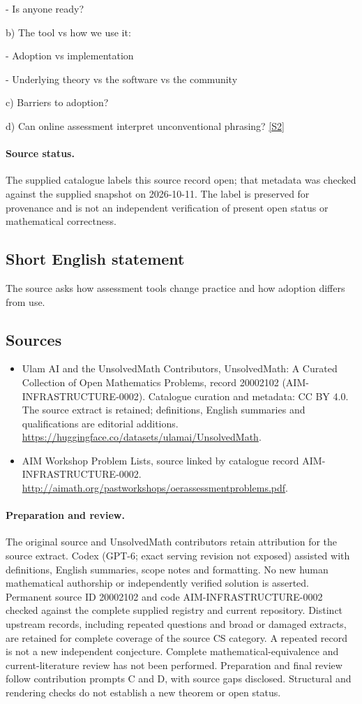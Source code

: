 \documentclass[11pt]{article}
\newcommand{\sref}[2]{\hyperlink{source:#1:#2}{[S#2]}}
\begin{document}
- Is anyone ready?

b) The tool vs how we use it:

- Adoption vs implementation

- Underlying theory vs the software vs the community

c) Barriers to adoption?

d) Can online assessment interpret unconventional phrasing? \sref{20002102}{2}
\paragraph{Source status.}
The supplied catalogue labels this source record open; that metadata was checked against the supplied snapshot on 2026-10-11. The label is preserved for provenance and is not an independent verification of present open status or mathematical correctness.
\subsection{Short English statement}
The source asks how assessment tools change practice and how adoption differs from use.
\subsection{Sources}
\begin{itemize}
\item[\hypertarget{source:20002102:1}{S1}] Ulam AI and the UnsolvedMath Contributors, UnsolvedMath: A Curated Collection of Open Mathematics Problems, record 20002102 (AIM-INFRASTRUCTURE-0002). Catalogue curation and metadata: CC BY 4.0. The source extract is retained; definitions, English summaries and qualifications are editorial additions.
\url{https://huggingface.co/datasets/ulamai/UnsolvedMath}.
\item[\hypertarget{source:20002102:2}{S2}] AIM Workshop Problem Lists, source linked by catalogue record AIM-INFRASTRUCTURE-0002.
\url{http://aimath.org/pastworkshops/oerassessmentproblems.pdf}.
\end{itemize}
\paragraph{Preparation and review.}
The original source and UnsolvedMath contributors retain attribution for the source extract. Codex (GPT-6; exact serving revision not exposed) assisted with definitions, English summaries, scope notes and formatting. No new human mathematical authorship or independently verified solution is asserted. Permanent source ID 20002102 and code AIM-INFRASTRUCTURE-0002 checked against the complete supplied registry and current repository. Distinct upstream records, including repeated questions and broad or damaged extracts, are retained for complete coverage of the source CS category. A repeated record is not a new independent conjecture. Complete mathematical-equivalence and current-literature review has not been performed. Preparation and final review follow contribution prompts C and D, with source gaps disclosed. Structural and rendering checks do not establish a new theorem or open status.
\label{end:20002102}
\end{document}

